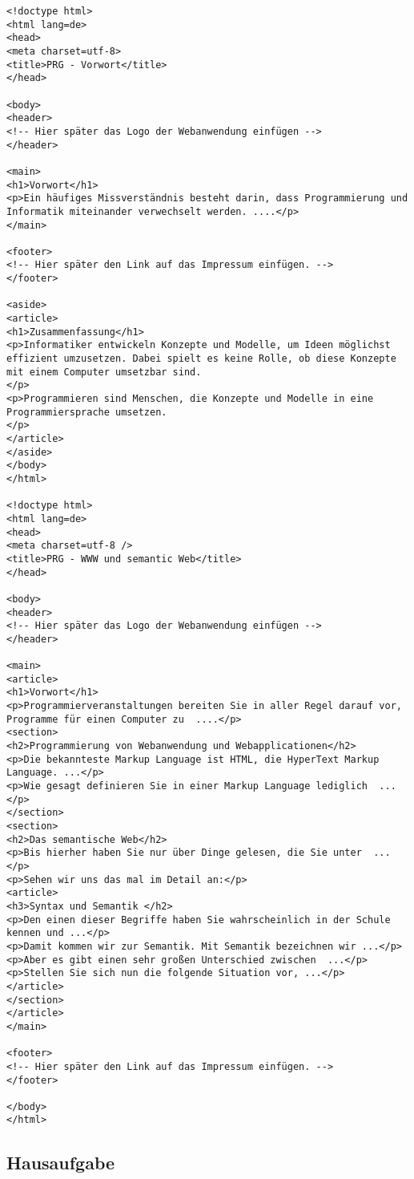 \begin{verbatim}
<!doctype html> 
<html lang=de> 
<head> 
<meta charset=utf-8>
<title>PRG - Vorwort</title> 
</head> 

<body> 
<header>
<!-- Hier später das Logo der Webanwendung einfügen -->
</header>

<main>
<h1>Vorwort</h1>
<p>Ein häufiges Missverständnis besteht darin, dass Programmierung und Informatik miteinander verwechselt werden. ....</p> 
</main>

<footer>
<!-- Hier später den Link auf das Impressum einfügen. -->
</footer>

<aside>
<article>
<h1>Zusammenfassung</h1>
<p>Informatiker entwickeln Konzepte und Modelle, um Ideen möglichst effizient umzusetzen. Dabei spielt es keine Rolle, ob diese Konzepte mit einem Computer umsetzbar sind.
</p>
<p>Programmieren sind Menschen, die Konzepte und Modelle in eine Programmiersprache umsetzen.
</p>
</article>
</aside>
</body> 
</html>

<!doctype html> 
<html lang=de> 
<head> 
<meta charset=utf-8 />
<title>PRG - WWW und semantic Web</title> 
</head> 

<body> 
<header>
<!-- Hier später das Logo der Webanwendung einfügen -->
</header>

<main>
<article>
<h1>Vorwort</h1>
<p>Programmierveranstaltungen bereiten Sie in aller Regel darauf vor, Programme für einen Computer zu  ....</p> 
<section>
<h2>Programmierung von Webanwendung und Webapplicationen</h2>
<p>Die bekannteste Markup Language ist HTML, die HyperText Markup Language. ...</p>
<p>Wie gesagt definieren Sie in einer Markup Language lediglich  ...</p>
</section>
<section>
<h2>Das semantische Web</h2>
<p>Bis hierher haben Sie nur über Dinge gelesen, die Sie unter  ...</p>
<p>Sehen wir uns das mal im Detail an:</p>
<article>
<h3>Syntax und Semantik </h2>
<p>Den einen dieser Begriffe haben Sie wahrscheinlich in der Schule kennen und ...</p>
<p>Damit kommen wir zur Semantik. Mit Semantik bezeichnen wir ...</p>
<p>Aber es gibt einen sehr großen Unterschied zwischen  ...</p>
<p>Stellen Sie sich nun die folgende Situation vor, ...</p>
</article>
</section>
</article>
</main>

<footer>
<!-- Hier später den Link auf das Impressum einfügen. -->
</footer>

</body> 
</html>
\end{verbatim}

\subsection{Hausaufgabe}

